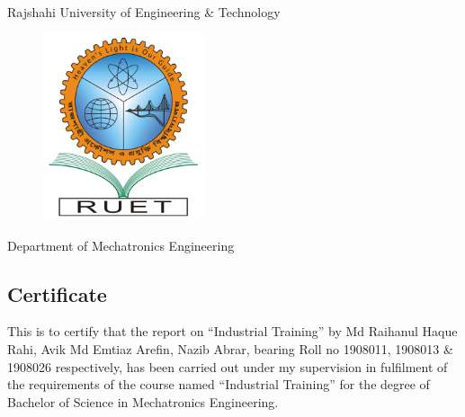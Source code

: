 \begin{center}
    Rajshahi University of Engineering \& Technology
\end{center}
\begin{figure}[h!]
    \centering
    \includegraphics[width=4.7cm]{figs/RUET.png}
    \label{fig:ruet2}
\end{figure}
\setlength{\columnsep}{0.1\textwidth}
\begin{center}
Department of Mechatronics Engineering
\subsection*{Certificate}
\end{center}

\noindent This is to certify that the report on “Industrial Training” by Md Raihanul Haque Rahi, Avik Md Emtiaz Arefin, Nazib Abrar, bearing Roll no 1908011, 1908013 \& 1908026 respectively, has been carried out under my supervision in fulfilment of the requirements of the course named “Industrial Training” for the degree of Bachelor of Science in Mechatronics Engineering. 


